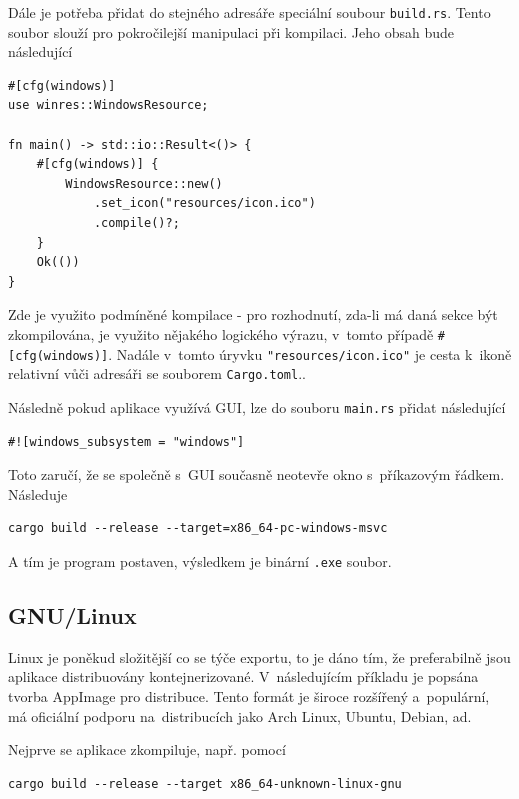\documentclass[a4paper, 12pt]{article} %
\newcommand{\rust}[1]{\texttt{#1}}
\begin{document}
        Dále je potřeba přidat do stejného adresáře speciální soubour \texttt{build.rs}. Tento soubor slouží pro pokročilejší manipulaci při kompilaci. Jeho obsah bude následující
        \begin{verbatim}
#[cfg(windows)]
use winres::WindowsResource;

fn main() -> std::io::Result<()> {
    #[cfg(windows)] {
        WindowsResource::new()
            .set_icon("resources/icon.ico")
            .compile()?;
    }
    Ok(())
}
        \end{verbatim}

        Zde je využito podmíněné kompilace - pro rozhodnutí, zda-li má daná sekce být zkompilována, je využito nějakého logického výrazu, v~tomto případě \texttt{#[cfg(windows)]}. Nadále v~tomto úryvku \rust{"resources/icon.ico"} je cesta k~ikoně relativní vůči adresáři se souborem \texttt{Cargo.toml}.\cite{comp_win_ico}.
        
        Následně pokud aplikace využívá GUI, lze do souboru \texttt{main.rs} přidat následující
        \begin{verbatim}
#![windows_subsystem = "windows"]
        \end{verbatim}
        
        Toto zaručí, že se společně s~GUI současně neotevře okno s~příkazovým řádkem. Následuje
        \begin{verbatim}
cargo build --release --target=x86_64-pc-windows-msvc
        \end{verbatim}
        
        A tím je program postaven, výsledkem je binární \texttt{.exe} soubor.\cite{winexport}


    \subsection{GNU/Linux}
        Linux je poněkud složitější co se týče exportu, to je dáno tím, že preferabilně jsou aplikace distribuovány kontejnerizované. V~následujícím příkladu je popsána tvorba AppImage pro distribuce. Tento formát je široce rozšířený a~populární, má oficiální podporu na~distribucích jako Arch Linux, Ubuntu, Debian, ad.\cite{appimage}

        Nejprve se aplikace zkompiluje, např. pomocí
        \begin{verbatim}
cargo build --release --target x86_64-unknown-linux-gnu
        \end{verbatim}
\end{document}
